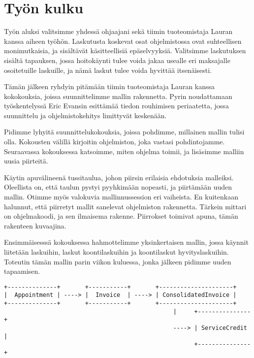 \vspace{21.5pt}

\hypertarget{tyuxf6n-kulku}{%
\section{Työn kulku}\label{tyuxf6n-kulku}}

Työn aluksi valitsimme yhdessä ohjaajani sekä tiimin tuoteomistaja
Lauran kanssa aiheen työhön. Laskutusta koskevat osat ohjelmistossa ovat
suhteellisen monimutkaisia, ja sisältävät käsitteellisiä epäselvyyksiä.
Valitsimme laskutuksen sisältä tapauksen, jossa hoitokäynti tulee voida
jakaa usealle eri maksajalle osoitetuille laskuille, ja nämä laskut
tulee voida hyvittää itsenäisesti.

Tämän jälkeen ryhdyin pitämään tiimin tuoteomistaja Lauran kanssa
kokokouksia, joissa suunnittelimme mallin rakennetta. Pyrin noudattamaan
työskentelyssä Eric Evansin esittämää tiedon rouhimisen periaatetta,
jossa suunnittelu ja ohjelmistokehitys limittyvät keskenään.

Pidimme lyhyitä suunnittelukokouksia, joissa pohdimme, millainen mallin
tulisi olla. Kokousten välillä kirjoitin ohjelmiston, joka vastasi
pohdintojamme. Seuraavassa kokouksessa katsoimme, miten ohjelma toimii,
ja lisäsimme malliin uusia piirteitä.

Käytin apuvälineenä tussitaulua, johon piirsin erilaisia ehdotuksia
malleiksi. Oleellista on, että taulun pystyi pyyhkimään nopeasti, ja
piirtämään uuden mallin. Otimme myös valokuvia mallinnussession eri
vaiheista. En kuitenkaan halunnut, että piirretyt mallit sanelevat
ohjelmiston rakennetta. Tärkein mittari on ohjelmakoodi, ja sen
ilmaisema rakenne. Piirrokset toimivat apuna, tämän rakenteen kuvaajina.

Ensimmäisesssä kokouksessa hahmottelimme yksinkertaisen mallin, jossa
käynnit liitetään laskuihin, laskut koontilaskuihin ja koontilaskut
hyvityslaskuihin. Toteutin tämän mallin parin viikon kuluessa, jonka
jälkeen pidimme uuden tapaamisen.

\begin{verbatim}
+--------------+       +-----------+       +---------------------+
|  Appointment | ----> |  Invoice  | ----> | ConsolidatedInvoice |
+--------------+       +-----------+       +---------------------+
                                                |     +---------------+ 
                                                ----> | ServiceCredit | 
                                                      +---------------+ 
\end{verbatim}

